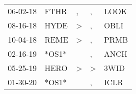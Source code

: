 \begin{supertabular}{p{0.07\textwidth}p{0.06\textwidth}p{0.02\textwidth}p{0.02\textwidth}p{0.06\textwidth}}
          06-02-18\textsuperscript{} &           FTHR\textsuperscript{} &                , &             , &  LOOK\textsuperscript{} \\
          08-16-18\textsuperscript{} &           HYDE\textsuperscript{} &     \textgreater &             , &  OBLI\textsuperscript{} \\
          10-04-18\textsuperscript{} &           REME\textsuperscript{} &     \textgreater &             , &  PRMB\textsuperscript{} \\
          02-16-19\textsuperscript{} &                            *OS1* &                  &             , &  ANCH\textsuperscript{} \\
          05-25-19\textsuperscript{} &           HERO\textsuperscript{} &     \textgreater &  \textgreater &  3WID\textsuperscript{} \\
          01-30-20\textsuperscript{} &                            *OS1* &                  &             , &  ICLR\textsuperscript{} \\
\end{supertabular}
